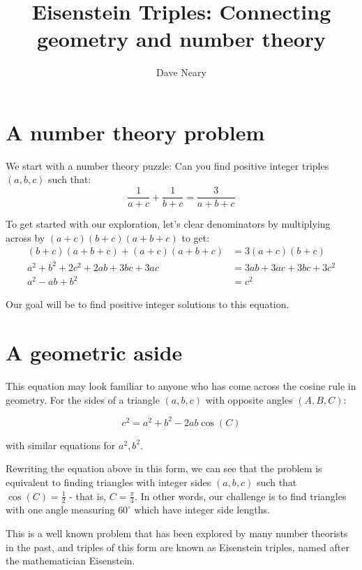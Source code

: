 \documentclass{article}
\begin{document}
\title{Eisenstein Triples: Connecting geometry and number theory}
\author{Dave Neary}

\maketitle

\section{A number theory problem}

We start with a number theory puzzle: Can you find positive integer triples $(a,b,c)$ such that:
\[ \frac{1}{a+c} + \frac{1}{b+c} = \frac{3}{a+b+c} \]

To get started with our exploration, let's clear denominators by multiplying across by
$(a+c)(b+c)(a+b+c)$ to get:
\begin{equation*}
\begin{split}
(b+c)(a+b+c) + (a+c)(a+b+c) & = 3(a+c)(b+c) \\
a^2 + b^2 + 2c^2 + 2ab + 3bc + 3ac & = 3ab + 3ac + 3bc + 3c^2 \\
a^2 - ab + b^2 &= c^2
\end{split}
\end{equation*}

Our goal will be to find positive integer solutions to this equation.

\section{A geometric aside}

This equation may look familiar to anyone who has come across the cosine rule in geometry.
For the sides of a triangle $(a,b,c)$ with opposite angles $(A,B,C)$:

\[ c^2 = a^2 + b^2 -2ab\cos(C) \]

with similar equations for $a^2, b^2$.

Rewriting the equation above in this form, we can see that the problem is equivalent to finding
triangles with integer sides $(a,b,c)$ such that $\cos(C) = \frac{1}{2}$ - that is,
$C = \frac{\pi}{3}$. In other words, our challenge is to find triangles with one angle measuring
$60^{\circ}$ which have integer side lengths.

This is a well known problem that has been explored by many number theorists in the past, and
triples of this form are known as Eisenstein triples, named after the mathematician Eisenstein.
\end{document}
